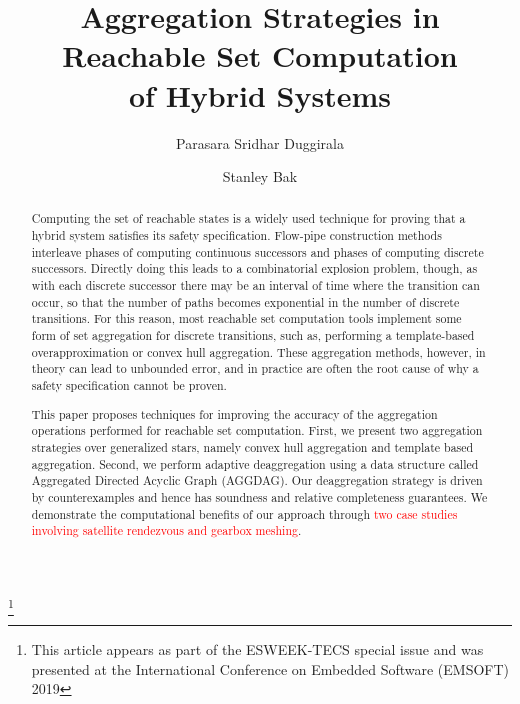 \documentclass[acmsmall]{acmart}
\newcommand{\new}[1]{\textcolor{red}{#1}}
\newcommand{\new}[1]{#1}
\newcommand\blfootnote[1]{%
  \begingroup
  \renewcommand\thefootnote{}\footnote{#1}%
  \addtocounter{footnote}{-1}%
  \endgroup
}
\begin{document}
\blfootnote{This article appears as part of the ESWEEK-TECS special issue and was presented at the International Conference on Embedded Software (EMSOFT) 2019}

%
\title{Aggregation Strategies in Reachable Set Computation\\ of Hybrid Systems}

%


\author{Parasara Sridhar Duggirala}

\author{Stanley Bak}




\begin{abstract}
  Computing the set of reachable states is a widely used technique for proving that a hybrid system satisfies its safety specification.
  Flow-pipe construction methods interleave phases of computing continuous successors and phases of computing discrete successors.
  Directly doing this leads to a combinatorial explosion problem, though, as with each discrete successor there may be an interval of time
  where the transition can occur, so that the number of paths becomes exponential in the number of discrete transitions.
  For this reason, most reachable set computation tools implement some form of set aggregation for discrete transitions, such as, performing a
  template-based overapproximation or convex hull aggregation.
  These aggregation methods, however, in theory can lead to unbounded error, and in practice are often
  the root cause of why a safety specification cannot be proven.

  This paper proposes techniques for improving the accuracy of the aggregation operations performed for reachable set computation.
  First, we present two aggregation strategies over generalized stars, namely convex hull aggregation and template based aggregation.
  Second, we perform adaptive deaggregation using a data structure called Aggregated Directed Acyclic Graph (AGGDAG).
  Our deaggregation strategy is driven by counterexamples and hence has soundness and relative completeness guarantees.
  We demonstrate the computational benefits of our approach through \new{two case studies involving satellite rendezvous and gearbox meshing}.
\end{abstract}
\end{document}

